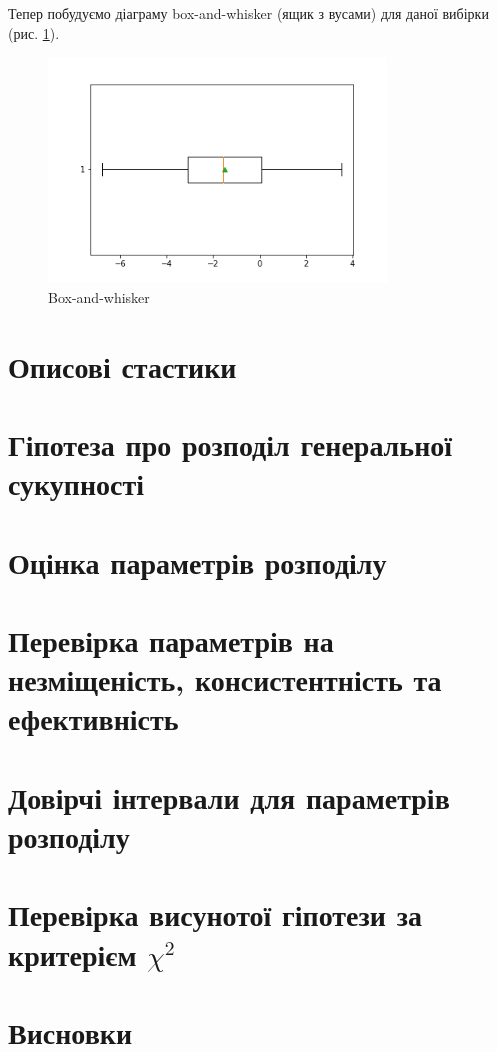\documentclass[14pt, a4paper, ukrainian]{extreport}
\begin{document}
	Тепер побудуємо діаграму box-and-whisker (ящик з вусами) для даної вибірки (рис. \ref{im:box_and_whisker}).
		\begin{figure}[H]
		\centering
		\includegraphics[width=0.8\textwidth]{./Image/Box_and_whisker.png}
		\caption{Box-and-whisker}
		\label{im:box_and_whisker}
	\end{figure}	
	
	\chapter{Описові стастики}
	
	
	\chapter{Гіпотеза про розподіл генеральної сукупності}
	\chapter{Оцінка параметрів розподілу}
	\chapter{Перевірка параметрів на незміщеність, консистентність та ефективність}
	\chapter{Довірчі інтервали для параметрів розподілу}
	\chapter{Перевірка висунотої гіпотези за критерієм $\chi^2$}
	\chapter*{Висновки}
	
	
\end{document}
